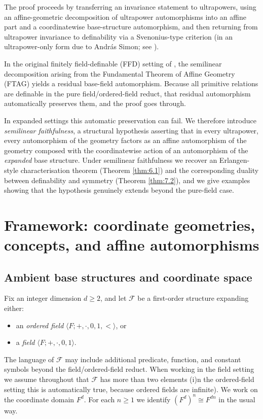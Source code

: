 \documentclass[11pt,a4paper]{article}
\newcommand{\F}{\mathcal{F}}
\theoremstyle{definition}
\begin{document}
The proof proceeds by transferring an invariance
statement to ultrapowers, using an affine-geometric decomposition of
ultrapower automorphisms into an affine part and a coordinatewise
base-structure automorphism, and then returning from ultrapower
invariance to definability via a Svenonius-type criterion (in an
ultrapower-only form due to András Simon; see \cite[Theorem~6.12]{MSS26}).

In the original finitely field-definable (FFD) setting of
\cite{MSS26}, the semilinear decomposition arising from the Fundamental Theorem of Affine Geometry (FTAG)
 yields a residual
base-field automorphism. Because all primitive relations are definable
in the pure field/ordered-field reduct, that residual automorphism
automatically preserves them, and the proof goes through.

In expanded settings this automatic preservation can fail. We therefore
introduce \emph{semilinear faithfulness}, a structural hypothesis
asserting that in every ultrapower, every automorphism of the geometry
factors as an affine automorphism of the geometry composed with the
coordinatewise action of an automorphism of the \emph{expanded} base
structure. Under semilinear faithfulness we recover an Erlangen-style
characterisation theorem (Theorem \ref{thm:6.1}) and the corresponding duality
between definability and symmetry (Theorem \ref{thm:7.2}), and we give examples
showing that the hypothesis genuinely extends beyond the pure-field
case.

\section{Framework: coordinate geometries, concepts, and affine automorphisms}
\label{sec:2}

\subsection{Ambient base structures and coordinate space}
\label{sec:2.1}

Fix an integer dimension $d\ge 2$, and let $\F$ be a first-order structure expanding either:

\begin{itemize}
\item
  an \emph{ordered field} $\langle F; +,\cdot,0,1,<\rangle$, or
\item
  a \emph{field} $\langle F; +,\cdot,0,1\rangle$.
\end{itemize}

The language of $\F$ may include additional predicate,
function, and constant symbols beyond the field/ordered-field reduct.
When working in the field setting we assume throughout that $\F$
has more than two elements (i)n the ordered-field setting
this is automatically true, because ordered fields are infinite).
We work on the coordinate domain $F^d$. For each $n\ge 1$ we
identify $(F^d)^n\cong F^{dn}$ in the usual way.
\end{document}
